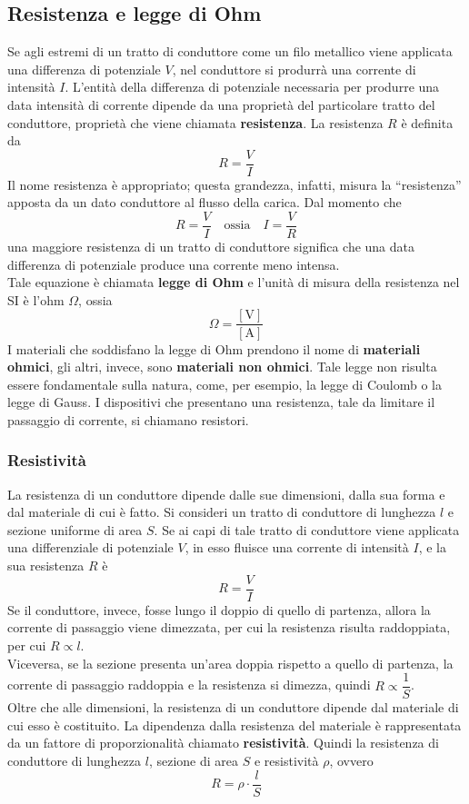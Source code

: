 \documentclass[a4paper]{extarticle}
\newcommand{\quotes}[1]{``#1''}
\begin{document}
\subsection{Resistenza e legge di Ohm}
Se agli estremi di un tratto di conduttore come un filo metallico viene applicata una differenza di potenziale $V$, nel conduttore si produrrà una corrente di intensità $I$. L'entità della differenza di potenziale necessaria per produrre una data intensità di corrente dipende da una proprietà del particolare tratto del conduttore, proprietà che viene chiamata \textbf{resistenza}. La resistenza $R$ è definita da
\[\boxed{R = \frac{V}{I}}\]
Il nome resistenza è appropriato; questa grandezza, infatti, misura la \quotes{resistenza} apposta da un dato conduttore al flusso della carica. Dal momento che
\[R = \frac{V}{I} \hspace{1em} \text{ossia} \hspace{1em} I = \dfrac{V}{R}\]
una maggiore resistenza di un tratto di conduttore significa che una data differenza di potenziale produce una corrente meno intensa.\\
Tale equazione è chiamata \textbf{legge di Ohm} e l'unità di misura della resistenza nel SI è l'ohm $\Omega$, ossia
\[\Omega = \dfrac{[\text{V}]}{[\text{A}]}\]
I materiali che soddisfano la legge di Ohm prendono il nome di \textbf{materiali ohmici}, gli altri, invece, sono \textbf{materiali non ohmici}. Tale legge non risulta essere fondamentale sulla natura, come, per esempio, la legge di Coulomb o la legge di Gauss. I dispositivi che presentano una resistenza, tale da limitare il passaggio di corrente, si chiamano resistori.

\vspace{1em}
\subsubsection{Resistività}
La resistenza di un conduttore dipende dalle sue dimensioni, dalla sua forma e dal materiale di cui è fatto. Si consideri un tratto di conduttore di lunghezza $l$ e sezione uniforme di area $S$. Se ai capi di tale tratto di conduttore viene applicata una differenziale di potenziale $V$, in esso fluisce una corrente di intensità $I$, e la sua resistenza $R$ è
\[R=\dfrac{V}{I}\]
Se il conduttore, invece, fosse lungo il doppio di quello di partenza, allora la corrente di passaggio viene dimezzata, per cui la resistenza risulta raddoppiata, per cui $R \propto l$.\\
Viceversa, se la sezione presenta un'area doppia rispetto a quello di partenza, la corrente di passaggio raddoppia e la resistenza si dimezza, quindi $R \propto \dfrac{1}{S}$.\\
Oltre che alle dimensioni, la resistenza di un conduttore dipende dal materiale di cui esso è costituito. La dipendenza dalla resistenza del materiale è rappresentata da un fattore di proporzionalità chiamato \textbf{resistività}. Quindi la resistenza di conduttore di lunghezza $l$, sezione di area $S$ e resistività $\rho$, ovvero
\[\boxed{R = \rho \cdot \dfrac{l}{S}}\]
\end{document}

